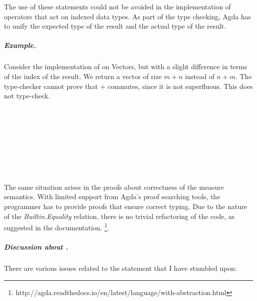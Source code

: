 \documentclass[12pt,twoside,notitlepage]{report}
\begin{document}
The use of these statements could not be avoided in the implementation of operators that act on indexed data types. As part of the type checking, Agda has to unify the expected type of the result and the actual type of the result. 

\subparagraph{Example.} Consider the implementation of  on Vectors, but with a slight difference in terms of the index of the result. We return a vector of size $m + n$ instead of $n + m$. The type-checker cannot prove that  $+$ commutes, since it is not superfluous. This does not type-check.

\begin{code}
\\
\> \AgdaSymbol{:}  \AgdaSymbol{\{}  \AgdaSymbol{\}}  \AgdaSymbol{\{} \AgdaSymbol{:}  \AgdaSymbol{\}}\<%
\\
\>[4]\<[6]%
\>[6]   \<%
\\
\>[4]\<[6]%
\>[6]   \<%
\\
\>[4]\<[6]%
\>[6]   \AgdaSymbol{(} \AgdaPrimitive{+} \AgdaSymbol{)}\<%
\\
\> \AgdaInductiveConstructor{[]}  \AgdaSymbol{=} \<%
\\
\> \AgdaSymbol{(}  \AgdaSymbol{)}  \AgdaSymbol{=}     \<%
\\
\end{code}

The same situation arises in the proofs about correctness of the measure semantics. With limited support from Agda's proof searching tools, the programmer has to provide proofs that ensure correct typing. Due to the nature of the \textit{Builtin.Equality} relation, there is no trivial refactoring of the code, as suggested in the documentation. \footnote{http://agda.readthedocs.io/en/latest/language/with-abstraction.html}.


\subparagraph{Discussion about .}There are various issues related to the  statement that I have stumbled upon:
\end{document}
